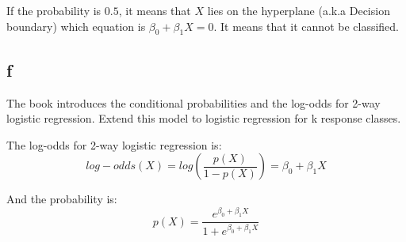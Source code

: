 If the probability is $0.5 $, it means that $X$ lies on the hyperplane (a.k.a Decision boundary) which equation is $ \beta_0 + \beta_1 X = 0 $. It means that it cannot be classified. 

\subsection*{f}

The book introduces the conditional probabilities and the log-odds for 2-way logistic regression. Extend this model to logistic regression for k response classes.

The log-odds for 2-way logistic regression is: 
\[ log-odds(X) = log(\frac{p(X)}{1 - p(X)}) = \beta_0 + \beta_1 X  \]

And the probability is: 
\[ p(X) = \frac{e^{\beta_0 + \beta_1 X}}{1 + e^{\beta_0 + \beta_1 X}} \]












